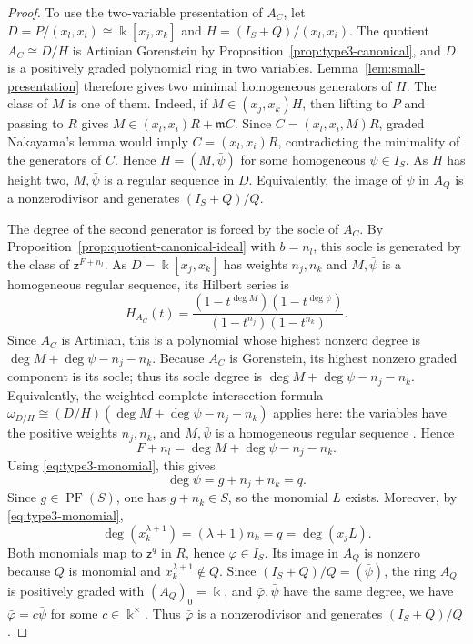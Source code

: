 \documentclass[10pt]{amsart}
\theoremstyle{plain}
\begin{document}
\begin{proof}
To use the two-variable presentation of \(A_C\), let
\(D=P/(x_l,x_i)\cong\Bbbk[x_j,x_k]\) and
\(H=(I_S+Q)/(x_l,x_i)\).  The quotient \(A_C\cong D/H\) is
Artinian Gorenstein by Proposition~\ref{prop:type3-canonical}, and
\(D\) is a positively graded polynomial ring in two variables.
Lemma~\ref{lem:small-presentation} therefore gives two minimal
homogeneous generators of \(H\).  The class of \(M\) is one of
them.  Indeed, if \(M\in(x_j,x_k)H\), then lifting to \(P\) and
passing to \(R\) gives
\(M\in(x_l,x_i)R+\mathfrak m C\).  Since
\(C=(x_l,x_i,M)R\), graded Nakayama's lemma would imply
\(C=(x_l,x_i)R\), contradicting the minimality of the generators of
\(C\).  Hence \(H=(M,\bar\psi)\) for some homogeneous
\(\psi\in I_S\).  As \(H\) has height two, \(M,\bar\psi\) is a
regular sequence in \(D\).  Equivalently, the image of \(\psi\) in
\(A_Q\) is a nonzerodivisor and generates \((I_S+Q)/Q\).

The degree of the second generator is forced by the socle of \(A_C\).
By Proposition~\ref{prop:quotient-canonical-ideal} with \(b=n_l\), this
socle is generated by the class of \(\mathsf z^{F+n_l}\).
As \(D=\Bbbk[x_j,x_k]\) has weights \(n_j,n_k\) and
\(M,\bar\psi\) is a homogeneous regular sequence, its Hilbert series is
\[
H_{A_C}(t)
=
\frac{(1-t^{\deg M})(1-t^{\deg\psi})}
     {(1-t^{n_j})(1-t^{n_k})}.
\]
Since \(A_C\) is Artinian, this is a polynomial whose highest nonzero
degree is \(\deg M+\deg\psi-n_j-n_k\).  Because \(A_C\) is
Gorenstein, its highest nonzero graded component is its socle; thus its
socle degree is
\(\deg M+\deg\psi-n_j-n_k\).  Equivalently, the weighted complete-intersection formula
\(\omega_{D/H}\cong(D/H)(\deg M+\deg\psi-n_j-n_k)\)
applies here: the variables have the positive weights \(n_j,n_k\), and
\(M,\bar\psi\) is a homogeneous regular sequence
\cite[Exercise~21.16]{Eis95}.  Hence
\[
F+n_l=\deg M+\deg\psi-n_j-n_k.
\]
Using \eqref{eq:type3-monomial}, this gives
\[
\deg\psi=g+n_j+n_k=q.
\]
Since \(g\in\operatorname{PF}(S)\), one has \(g+n_k\in S\), so the
monomial \(L\) exists.  Moreover, by \eqref{eq:type3-monomial},
\[
\deg(x_k^{\lambda+1})
=(\lambda+1)n_k
=q
=\deg(x_jL).
\]
Both monomials map to \(\mathsf z^q\) in \(R\), hence
\(\varphi\in I_S\).  Its image in \(A_Q\) is nonzero because \(Q\)
is monomial and \(x_k^{\lambda+1}\notin Q\).  Since
\((I_S+Q)/Q=(\bar\psi)\), the ring \(A_Q\) is positively graded with
\((A_Q)_0=\Bbbk\), and \(\bar\varphi,\bar\psi\) have the same degree,
we have \(\bar\varphi=c\bar\psi\) for some
\(c\in\Bbbk^\times\).  Thus \(\bar\varphi\) is a nonzerodivisor and
generates \((I_S+Q)/Q\).


\end{proof}
\end{document}
